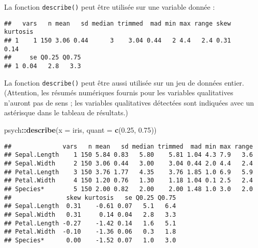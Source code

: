 \documentclass[
  french,
]{book}
\newenvironment{Shaded}{\begin{snugshade}}{\end{snugshade}}
\newcommand{\DataTypeTok}[1]{\textcolor[rgb]{0.13,0.29,0.53}{#1}}
\newcommand{\FloatTok}[1]{\textcolor[rgb]{0.00,0.00,0.81}{#1}}
\newcommand{\KeywordTok}[1]{\textcolor[rgb]{0.13,0.29,0.53}{\textbf{#1}}}
\newcommand{\NormalTok}[1]{#1}
\newcommand{\OperatorTok}[1]{\textcolor[rgb]{0.81,0.36,0.00}{\textbf{#1}}}
\begin{document}
La fonction \texttt{describe()} peut être utilisée sur une variable donnée :

\begin{Shaded}
\end{Shaded}

\begin{verbatim}
##   vars   n mean   sd median trimmed  mad min max range skew kurtosis
## 1    1 150 3.06 0.44      3    3.04 0.44   2 4.4   2.4 0.31     0.14
##     se Q0.25 Q0.75
## 1 0.04   2.8   3.3
\end{verbatim}

La fonction \texttt{describe()} peut être aussi utilisée sur un jeu de données entier. (Attention, les résumés numériques fournis pour les variables qualitatives n'auront pas de sens ; les variables qualitatives détectées sont indiquées avec un astérisque dans le tableau de résultats.)

\begin{Shaded}
\begin{Highlighting}[]
\NormalTok{psych}\OperatorTok{::}\KeywordTok{describe}\NormalTok{(}\DataTypeTok{x =}\NormalTok{ iris, }\DataTypeTok{quant =} \KeywordTok{c}\NormalTok{(}\FloatTok{0.25}\NormalTok{, }\FloatTok{0.75}\NormalTok{))}
\end{Highlighting}
\end{Shaded}

\begin{verbatim}
##              vars   n mean   sd median trimmed  mad min max range
## Sepal.Length    1 150 5.84 0.83   5.80    5.81 1.04 4.3 7.9   3.6
## Sepal.Width     2 150 3.06 0.44   3.00    3.04 0.44 2.0 4.4   2.4
## Petal.Length    3 150 3.76 1.77   4.35    3.76 1.85 1.0 6.9   5.9
## Petal.Width     4 150 1.20 0.76   1.30    1.18 1.04 0.1 2.5   2.4
## Species*        5 150 2.00 0.82   2.00    2.00 1.48 1.0 3.0   2.0
##               skew kurtosis   se Q0.25 Q0.75
## Sepal.Length  0.31    -0.61 0.07   5.1   6.4
## Sepal.Width   0.31     0.14 0.04   2.8   3.3
## Petal.Length -0.27    -1.42 0.14   1.6   5.1
## Petal.Width  -0.10    -1.36 0.06   0.3   1.8
## Species*      0.00    -1.52 0.07   1.0   3.0
\end{verbatim}
\end{document}
